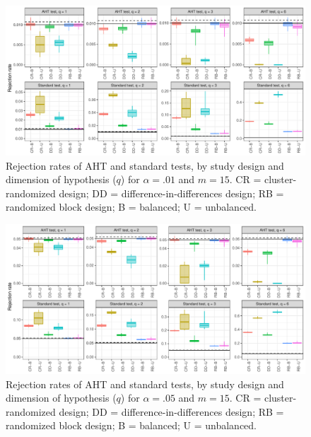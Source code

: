 \documentclass[12pt]{article}
\begin{document}
\begin{landscape}
\begin{figure}[p]

{\centering \includegraphics[width=\linewidth]{CR_fig/balance_01_15-1} 

}

\caption{Rejection rates of AHT and standard tests, by study design and dimension of hypothesis ($q$) for $\alpha = .01$ and $m = 15$. CR = cluster-randomized design; DD = difference-in-differences design; RB = randomized block design; B = balanced; U = unbalanced.}\label{fig:balance_01_15}
\end{figure}

\begin{figure}[p]

{\centering \includegraphics[width=\linewidth]{CR_fig/balance_05_15-1} 

}

\caption{Rejection rates of AHT and standard tests, by study design and dimension of hypothesis ($q$) for $\alpha = .05$ and $m = 15$. CR = cluster-randomized design; DD = difference-in-differences design; RB = randomized block design; B = balanced; U = unbalanced.}\label{fig:balance_05_15}
\end{figure}

\begin{figure}[p]


\end{figure}
\end{landscape}
\end{document}
